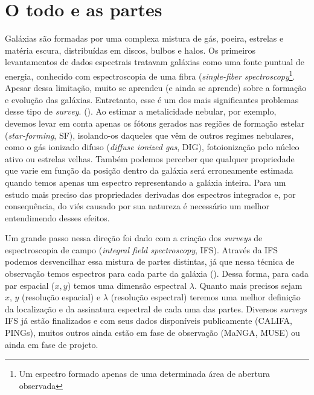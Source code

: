 \section{O todo e as partes}
\label{sec:intro:}

Galáxias são formadas por uma complexa mistura de gás, poeira, estrelas e matéria escura, distribuídas em discos, bulbos e halos. Os primeiros levantamentos de dados espectrais tratavam galáxias como uma fonte puntual de energia, conhecido com espectroscopia de uma fibra ({\em single-fiber spectroscopy}\footnote{Um espectro formado apenas de uma determinada área de abertura observada}. Apesar dessa limitação, muito se aprendeu (e ainda se aprende) sobre a formação e evolução das galáxias. Entretanto, esse é um dos mais significantes problemas desse tipo de {\em survey}. (). Ao estimar a metalicidade nebular, por exemplo, devemos levar em conta apenas os fótons gerados nas regiões de formação estelar ({\em star-forming}, SF), isolando-os daqueles que vêm de outros regimes nebulares, como o gás ionizado difuso ({\em diffuse ionized gas}, DIG), fotoionização pelo núcleo ativo ou estrelas velhas. Também podemos perceber que qualquer propriedade que varie em função da posição dentro da galáxia será erroneamente estimada quando temos apenas um espectro representando a galáxia inteira. Para um estudo mais preciso das propriedades derivadas dos espectros integrados e, por consequência, do viés causado por sua natureza é necessário um melhor entendimendo desses efeitos.

Um grande passo nessa direção foi dado com a criação dos {\em surveys} de espectroscopia de campo ({\em integral field spectroscopy}, IFS). Através da IFS podemos desvencilhar essa mistura de partes distintas, já que nessa técnica de observação temos espectros para cada parte da galáxia (). Dessa forma, para cada par espacial ($x,y$) temos uma dimensão espectral $\lambda$. Quanto mais precisos sejam $x$, $y$ (resolução espacial) e $\lambda$ (resolução espectral) teremos uma melhor definição da localização e da assinatura espectral de cada uma das partes. Diversos {\em surveys} IFS já estão finalizados e com seus dados disponíveis publicamente ({\ATR CALIFA, PINGs}), muitos outros ainda estão em fase de observação ({\ATR MaNGA, MUSE}) ou ainda em fase de projeto.














